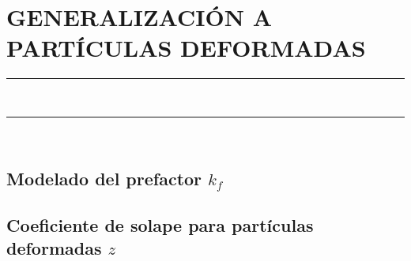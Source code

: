 \pagestyle{plain}
\chapter{GENERALIZACIÓN A PARTÍCULAS DEFORMADAS}\label{Sintering}
\vspace{0.2cm}
\noindent\rule{\linewidth}{1.5pt}\\
\startcontents[chapters]
\vspace{0.2cm}
\noindent\rule{\linewidth}{1.3pt}\\
\newpage
\section{Modelado del prefactor $k_f$}
\section{Coeficiente de solape para partículas deformadas $z$}

\newpage
%

% 
% 

